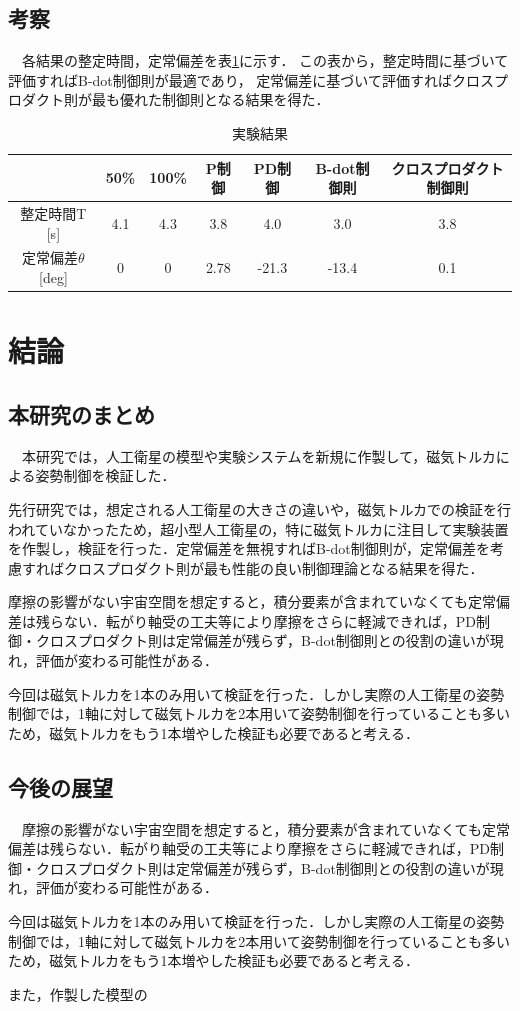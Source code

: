 \subsection{考察}
　各結果の整定時間，定常偏差を表\ref{table:result}に示す．
この表から，整定時間に基づいて評価すればB-dot制御則が最適であり，
定常偏差に基づいて評価すればクロスプロダクト則が最も優れた制御則となる結果を得た．

\begin{table}[H]
	\centering
	\caption{実験結果}
	\label{table:result}
	\begin{tabular}{|c||c|c|c|c|c|c|}
		\hline
		 & 50\% & 100\% & P制御 & PD制御 & B-dot制御則 & クロスプロダクト制御則 \\ \hline
		整定時間T [s] & 4.1 & 4.3 & 3.8 & 4.0 & 3.0 & 3.8 \\ \hline
		定常偏差$\theta$ [deg] & 0 & 0 & 2.78 & -21.3 & -13.4 & 0.1 \\ \hline
	\end{tabular}
\end{table}


\newpage
\section{結論}
\subsection{本研究のまとめ}
　本研究では，人工衛星の模型や実験システムを新規に作製して，磁気トルカによる姿勢制御を検証した．

先行研究では，想定される人工衛星の大きさの違いや，磁気トルカでの検証を行われていなかったため，超小型人工衛星の，特に磁気トルカに注目して実験装置を作製し，検証を行った．定常偏差を無視すればB-dot制御則が，定常偏差を考慮すればクロスプロダクト則が最も性能の良い制御理論となる結果を得た．

摩擦の影響がない宇宙空間を想定すると，積分要素が含まれていなくても定常偏差は残らない．転がり軸受の工夫等により摩擦をさらに軽減できれば，PD制御・クロスプロダクト則は定常偏差が残らず，B-dot制御則との役割の違いが現れ，評価が変わる可能性がある． 

今回は磁気トルカを1本のみ用いて検証を行った．しかし実際の人工衛星の姿勢制御では，1軸に対して磁気トルカを2本用いて姿勢制御を行っていることも多いため，磁気トルカをもう1本増やした検証も必要であると考える．

\subsection{今後の展望}

　摩擦の影響がない宇宙空間を想定すると，積分要素が含まれていなくても定常偏差は残らない．転がり軸受の工夫等により摩擦をさらに軽減できれば，PD制御・クロスプロダクト則は定常偏差が残らず，B-dot制御則との役割の違いが現れ，評価が変わる可能性がある． 

今回は磁気トルカを1本のみ用いて検証を行った．しかし実際の人工衛星の姿勢制御では，1軸に対して磁気トルカを2本用いて姿勢制御を行っていることも多いため，磁気トルカをもう1本増やした検証も必要であると考える．

また，作製した模型の